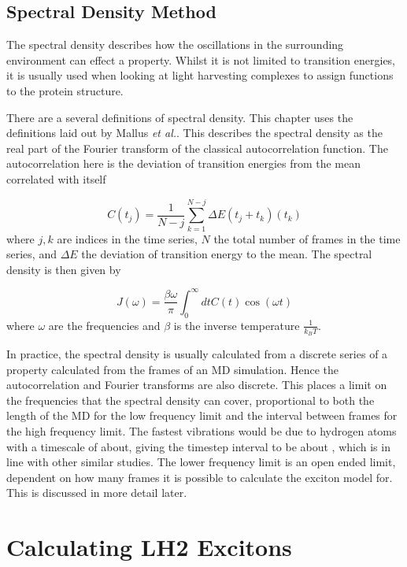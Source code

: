 \subsection{Spectral Density Method}
\label{subsec:spec_dens}

The spectral density describes how the oscillations in the surrounding environment 
can effect a property. Whilst it is not limited to transition energies, it is usually
used when looking at light harvesting complexes to assign functions to the protein
structure. 

There are a several definitions of spectral density. This chapter uses the definitions
laid out by Mallus \emph{et al.}. This describes the spectral density
as the real part of the Fourier transform of the classical autocorrelation function.
The autocorrelation here is the deviation of transition energies from the mean correlated
with itself

\begin{equation}
    C\left(t_j\right) = \frac{1}{N-j} \sum^{N-j}_{k=1} \Delta E \left(t_j + t_k\right) \left(t_k\right)
\end{equation}
%
where $j,k$ are indices in the time series, $N$ the total number of frames in the
time series, and $\Delta E$ the deviation of transition energy to the mean. The
spectral density is then given by

\begin{equation}
    J\left(\omega\right) = \frac{\beta \omega}{\pi} \int^\infty_0 dt C\left(t\right) \cos \left(\omega t\right)
\end{equation}
%
where $\omega$ are the frequencies and $\beta$ is the inverse temperature $\frac{1}{k_B T}$.

In practice, the spectral density is usually calculated from a discrete series of 
a property calculated from the frames of an MD simulation. Hence the autocorrelation
and Fourier transforms are also discrete. This places a limit on the frequencies 
that the spectral density can cover, proportional to both the length of the MD
for the low frequency limit and the interval between frames for the high frequency
limit. The fastest vibrations would be due to hydrogen atoms with a timescale of 
about, giving the timestep interval to be about , which is in line with other similar
studies. The lower frequency limit is an open ended limit, dependent on how many
frames it is possible to calculate the exciton model for. This is discussed in more
detail later.

\section{Calculating LH2 Excitons}
\label{sec:MD}

